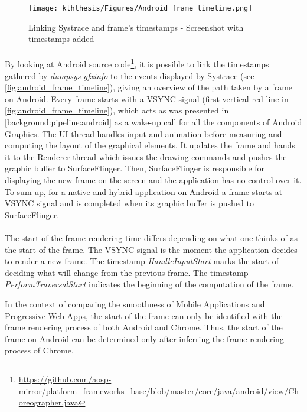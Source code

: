 \documentclass{kththesis}
\begin{document}
    \begin{figure}[!ht]
        \centering
        \texttt{[image: kththesis/Figures/Android\_frame\_timeline.png]}
        \caption{Linking Systrace and frame's timestamps - Screenshot with timestamps added}
        \label{fig:android_frame_timeline}
    \end{figure}
    
    \paragraph{}
    By looking at Android source code\footnote{\url{https://github.com/aosp-mirror/platform_frameworks_base/blob/master/core/java/android/view/Choreographer.java}}, it is possible to link the timestamps gathered by \textit{dumpsys gfxinfo} to the events displayed by Systrace (see \autoref{fig:android_frame_timeline}), giving an overview of the path taken by a frame on Android. \newline
    \indent Every frame starts with a VSYNC signal (first vertical red line in \autoref{fig:android_frame_timeline}), which acts as was presented in \autoref{background:pipeline:android} as a wake-up call for all the components of Android Graphics. The UI thread handles input and animation before measuring and computing the layout of the graphical elements. It updates the frame and hands it to the Renderer thread which issues the drawing commands and pushes the graphic buffer to SurfaceFlinger. Then, SurfaceFlinger is responsible for displaying the new frame on the screen and the application has no control over it. To sum up, for a native and hybrid application on Android a frame starts at VSYNC signal and is completed when its graphic buffer is pushed to SurfaceFlinger. 
    
    \paragraph{}
    The start of the frame rendering time differs depending on what one thinks of as the start of the frame. The VSYNC signal is the moment the application decides to render a new frame. The timestamp \textit{HandleInputStart} marks the start of deciding what will change from the previous frame. The timestamp \textit{PerformTraversalStart} indicates the beginning of the computation of the frame. \newline
    
    In the context of comparing the smoothness of Mobile Applications and Progressive Web Apps, the start of the frame can only be identified with the frame rendering process of both Android and Chrome. Thus, the start of the frame on Android can be determined only after inferring the frame rendering process of Chrome. 
\end{document}
